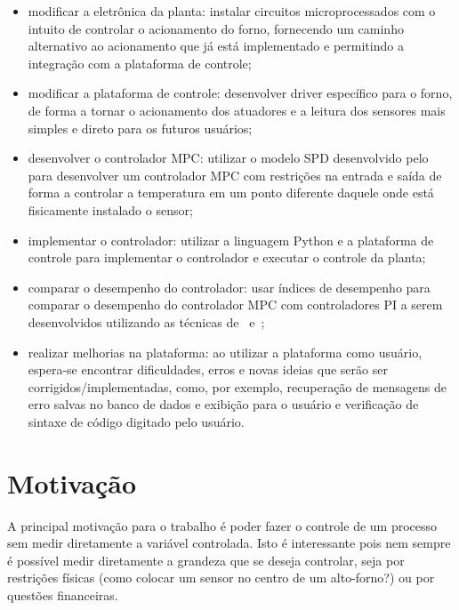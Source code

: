 \begin{itemize}
      \item modificar a eletrônica da planta: instalar circuitos
            microprocessados com o intuito de controlar o acionamento do forno,
            fornecendo um caminho alternativo ao acionamento que já está
            implementado e permitindo a integração com a plataforma de controle;
      \item modificar a plataforma de controle: desenvolver driver específico
            para o forno, de forma a tornar o acionamento dos atuadores e a
            leitura dos sensores mais simples e direto para os futuros usuários;
      \item desenvolver o controlador \ac{MPC}\@: utilizar o modelo \ac{SPD}
            desenvolvido pelo~\textcite{masterthesis:nelson} para desenvolver um
            controlador \ac{MPC} com restrições na entrada e saída de forma a
            controlar a temperatura em um ponto diferente daquele onde está
            fisicamente instalado o sensor;
      \item implementar o controlador: utilizar a linguagem Python e a
            plataforma de controle para implementar o controlador e executar o
            controle da planta;
      \item comparar o desempenho do controlador: usar índices de desempenho
            para comparar o desempenho do controlador \ac{MPC} com controladores
            PI a serem desenvolvidos utilizando as técnicas
            de~\textcite{article:clarke} e~\textcite{article:martins};
      \item realizar melhorias na plataforma: ao utilizar a plataforma como
            usuário, espera-se encontrar dificuldades, erros e novas ideias que
            serão ser corrigidos/implementadas, como, por exemplo, recuperação
            de mensagens de erro salvas no banco de dados e exibição para o
            usuário e verificação de sintaxe de código digitado pelo usuário.
\end{itemize}

\section{Motivação}%
\label{sec:motivacao}

A principal motivação para o trabalho é poder fazer o controle de um processo
sem medir diretamente a variável controlada. Isto é interessante pois nem sempre
é possível medir diretamente a grandeza que se deseja controlar, seja por
restrições físicas (como colocar um sensor no centro de um alto-forno?) ou por
questões financeiras.

